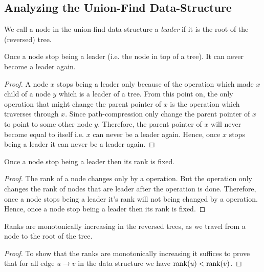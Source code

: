 \subsection{Analyzing the Union-Find Data-Structure}\label{analysis-union-find}
We call a node in the union-find data-structure a \emph{leader} if it is the root of the (reversed) tree.
\begin{lemma}{}{}
	Once a node stop being a {leader} (i.e. the node in top of a tree). It can never become a leader again.
\end{lemma}
\begin{proof}
	A node $x$ stops being a {leader} only because of the  operation which made $x$ child of a node $y$ which is a {leader} of a tree. From this point on, the only operation that might change the parent pointer of $x$ is the  operation which traverses through $x$. Since path-compression only change the parent pointer of $x$ to point to some other node $y$. Therefore, the parent pointer of $x$ will never become equal to itself i.e. $x$ can never be a {leader} again. Hence, once $x$ stops being a {leader} it can never be a {leader} again.
\end{proof}
\begin{lemma}{}{}
	Once a node stop being a leader then its rank is fixed.
\end{lemma}
\begin{proof}
	The rank of a node changes only by a  operation. But the  operation only changes the rank of nodes that are {leader} after the operation is done. Therefore, once a node stops being a {leader} it's rank will not being changed by a  operation. Hence, once a node stop being a leader then its rank is fixed.
\end{proof}
\begin{lemma}{}{}
	Ranks are monotonically increasing in the reversed trees, as we travel from a node to
	the root of the tree.
\end{lemma}
\begin{proof}
	To show that the ranks are monotonically increasing  it suffices to prove that for all edge $u\to v$ in the data structure we have $\operatorname{rank}(u)<\operatorname{rank}(v)$.
\end{proof}

